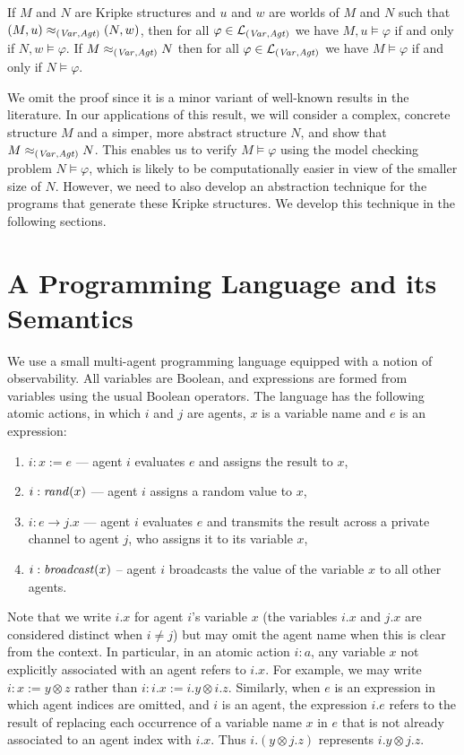 \documentclass[]{llncs}
\newcommand{\lang}{{\cal L}}
\newcommand{\be}{\begin{enumerate}}
\newcommand{\ee}{\end{enumerate}}
\newcommand{\xor}{\otimes}
\newcommand{\rand}{{\it rand}}
\newcommand{\broadcast}{{\it broadcast}}
\newcommand{\Agt}{{\it Agt}}
\newcommand{\Var}{{\it Var}}
\begin{document}
\begin{lemma}
If $M$ and $N$ are Kripke structures and $u$ and $w$ are worlds of 
$M$ and $N$ such that
 $(M,u) \approx_{(\Var,\Agt)} (N, w)$, then 
 for all $\varphi \in \lang_{(\Var,\Agt)}$ we have 
$M, u\models \varphi$ if and only if $N, w \models \varphi$. 
If $M\approx_{(\Var,\Agt)} N$ then for all $\varphi \in \lang_{(\Var,\Agt)}$ we have 
$M \models \varphi$ if and only if $N \models \varphi$.
\end{lemma}
 
We omit the proof since it is a minor variant of well-known results 
in the literature.  
In our applications of this result, 
we will consider a complex, concrete structure $M$ 
and a simper, more abstract structure $N$, and show that 
$M\approx_{(\Var, \Agt)} N$. This enables us to verify 
$M \models \varphi$ using the model checking problem
$N \models \varphi$, which is likely to be computationally 
easier in view of the smaller size of $N$. However, we need 
to also develop an abstraction technique for the programs that 
generate these Kripke structures. We develop this technique in the following sections. 

\section{A Programming Language and its Semantics} \label{sec:programs} 

We use a small multi-agent programming language equipped with a notion of observability. 
All variables are Boolean,  and expressions are formed from variables  using the usual Boolean operators. 
The language has the following 
atomic actions, 
in which $i$ and $j$ are  agents,  $x$ is a variable name and $e$ is an expression: 
\be 
\item $i: x:=e$  ---  agent $i$ evaluates $e$ and assigns the result to $x$, 
\item $i: \rand(x)$ --- agent $i$ assigns a random value to $x$,  
\item $i: e \rightarrow j.x$ --- agent $i$ evaluates $e$ and transmits the result across a private channel  to agent $j$, 
 who assigns it to its variable $x$, 
 \item $i: \broadcast(x)$ --  agent $i$ broadcasts the value of the variable $x$ to all other agents. 
\ee
Note that we write $i.x$ for agent $i$'s variable $x$ (the variables $i.x$ and $j.x$ are considered distinct when $i\neq j$)
but may omit the agent name when this is clear from the context.   In particular,  in
an atomic action $i:a$, any variable $x$ not explicitly associated with an agent
refers to $i.x$. For example, we may write $i: x := y \xor z$ rather than $i: i.x := i.y \xor i.z$. 
Similarly, when $e$ is an expression in which agent indices are omitted, and $i$ is an agent, 
the expression $i.e$ refers to the result of replacing each occurrence of a variable name $x$ in $e$ 
that is not already associated to an agent index 
with $i.x$. Thus $i.(y \xor j.z)$ represents  $i.y \xor j.z$. 
\end{document}

